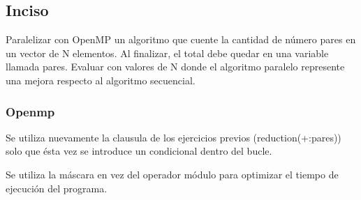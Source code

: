 \subsection{Inciso}

Paralelizar con OpenMP un algoritmo que cuente la cantidad de número pares en un vector de N elementos. Al finalizar, el total debe quedar en una variable llamada pares.
Evaluar con valores de N donde el algoritmo paralelo represente una mejora respecto al algoritmo secuencial.

\subsubsection{Openmp}

Se utiliza nuevamente la clausula de los ejercicios previos (reduction(+:pares)) solo que ésta vez se introduce un condicional dentro del bucle.


Se utiliza la máscara en vez del operador módulo para optimizar el tiempo de ejecución del programa.